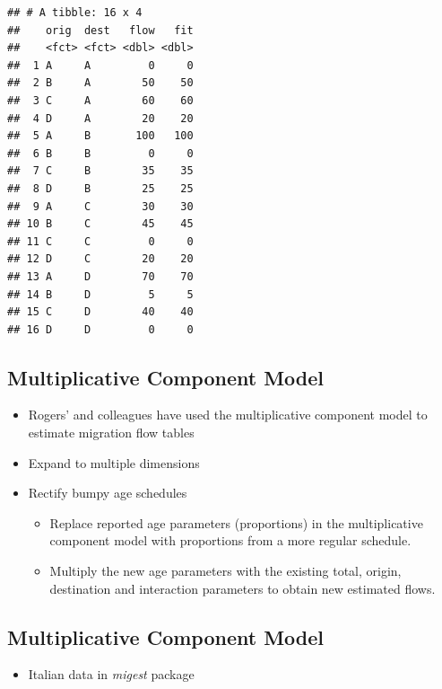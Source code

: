 \documentclass[
]{book}
\providecommand{\tightlist}{%
  \setlength{\itemsep}{0pt}\setlength{\parskip}{0pt}}
\begin{document}
\begin{verbatim}
## # A tibble: 16 x 4
##    orig  dest   flow   fit
##    <fct> <fct> <dbl> <dbl>
##  1 A     A         0     0
##  2 B     A        50    50
##  3 C     A        60    60
##  4 D     A        20    20
##  5 A     B       100   100
##  6 B     B         0     0
##  7 C     B        35    35
##  8 D     B        25    25
##  9 A     C        30    30
## 10 B     C        45    45
## 11 C     C         0     0
## 12 D     C        20    20
## 13 A     D        70    70
## 14 B     D         5     5
## 15 C     D        40    40
## 16 D     D         0     0
\end{verbatim}

\hypertarget{multiplicative-component-model-7}{%
\subsection{Multiplicative Component Model}\label{multiplicative-component-model-7}}

\begin{itemize}
\tightlist
\item
  Rogers' and colleagues have used the multiplicative component model to estimate migration flow tables
\item
  Expand to multiple dimensions
\item
  Rectify bumpy age schedules

  \begin{itemize}
  \tightlist
  \item
    Replace reported age parameters (proportions) in the multiplicative component model with proportions from a more regular schedule.
  \item
    Multiply the new age parameters with the existing total, origin, destination and interaction parameters to obtain new estimated flows.
  \end{itemize}
\end{itemize}

\hypertarget{multiplicative-component-model-8}{%
\subsection{Multiplicative Component Model}\label{multiplicative-component-model-8}}

\begin{itemize}
\tightlist
\item
  Italian data in \emph{migest} package
\end{itemize}
\end{document}
